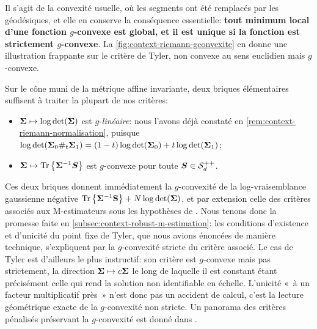 Il s'agit de la convexité usuelle, où les segments ont été remplacés par les géodésiques, et elle en conserve la conséquence essentielle: \textbf{tout minimum local d'une fonction $g$-convexe est global, et il est unique si la fonction est strictement $g$-convexe}. La \cref{fig:context-riemann-gconvexite} en donne une illustration frappante sur le critère de Tyler, non convexe au sens euclidien mais $g$-convexe.

Sur le cône muni de la métrique affine invariante, deux briques élémentaires suffisent à traiter la plupart de nos critères:
\begin{itemize}
  \item $\boldsymbol{\Sigma}\mapsto\log\operatorname{\operatorname{det}}(\boldsymbol{\Sigma})$ est $g$-\emph{linéaire}: nous l'avons déjà constaté en \cref{rem:context-riemann-normalisation}, puisque $\log\operatorname{\operatorname{det}}(\boldsymbol{\Sigma}_0\#_t\boldsymbol{\Sigma}_1)=(1-t)\log\operatorname{\operatorname{det}}(\boldsymbol{\Sigma}_0)+t\log\operatorname{\operatorname{det}}(\boldsymbol{\Sigma}_1)$;
  \item $\boldsymbol{\Sigma}\mapsto\operatorname{\operatorname{Tr}}\left\{{\boldsymbol{\Sigma}}^{-1}\boldsymbol{S}\right\}$ est $g$-convexe pour toute $\boldsymbol{S}\in\mathcal{S}_{d}^{++}$.
\end{itemize}

\begin{remark}
\label{rem:context-riemann-gconvexiteM}
  Ces deux briques donnent immédiatement la $g$-convexité de la log-vraisemblance gaussienne négative $\operatorname{\operatorname{Tr}}\left\{{\boldsymbol{\Sigma}}^{-1}\mathbf{S}\right\}+N\log\operatorname{\operatorname{det}}(\boldsymbol{\Sigma})$, et par extension celle des critères associés aux M-estimateurs sous les hypothèses de . Nous tenons donc la promesse faite en \cref{subsec:context-robust-m-estimation}: les conditions d'existence et d'unicité du point fixe de Tyler, que nous avions énoncées de manière technique, s'expliquent par la $g$-convexité stricte du critère associé. Le cas de Tyler est d'ailleurs le plus instructif: son critère est $g$-convexe mais pas strictement, la direction $\boldsymbol{\Sigma}\mapsto c\boldsymbol{\Sigma}$ le long de laquelle il est constant étant précisément celle qui rend la solution non identifiable en échelle. L'unicité «~à un facteur multiplicatif près~» n'est donc pas un accident de calcul, c'est la lecture géométrique exacte de la $g$-convexité non stricte. Un panorama des critères pénalisés préservant la $g$-convexité est donné dans .
\end{remark}

